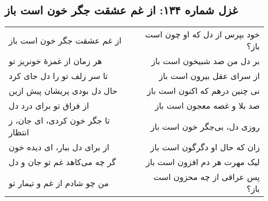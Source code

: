 \begin{center}
\section*{غزل شماره ۱۳۴: از غم عشقت جگر خون است باز}
\label{sec:134}
\begin{longtable}{l p{0.5cm} r}
از غم عشقت جگر خون است باز
&&
خود بپرس از دل که او چون است باز؟
\\
هر زمان از غمزهٔ خونریز تو
&&
بر دل من صد شبیخون است باز
\\
تا سر زلف تو را دل جای کرد
&&
از سرای عقل بیرون است باز
\\
حال دل بودی پریشان پیش ازین
&&
نی چنین درهم که اکنون است باز
\\
از فراق تو برای درد دل
&&
صد بلا و غصه معجون است باز
\\
تا جگر خون کردی، ای جان، ز انتظار
&&
روزی دل، بی‌جگر خون است باز
\\
از برای دل ببار، ای دیده خون
&&
زان که حال او دگرگون است باز
\\
گر چه می‌کاهد غم تو جان و دل
&&
لیک مهرت هر دم افزون است باز
\\
من چو شادم از غم و تیمار تو
&&
پس عراقی از چه محزون است باز؟
\\
\end{longtable}
\end{center}
